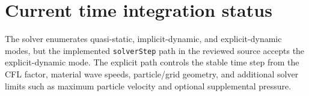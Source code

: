 \section{Current time integration status}
The solver enumerates quasi-static, implicit-dynamic, and explicit-dynamic modes, but the implemented \texttt{solverStep} path in the reviewed source accepts the explicit-dynamic mode.  The explicit path controls the stable time step from the CFL factor, material wave speeds, particle/grid geometry, and additional solver limits such as maximum particle velocity and optional supplemental pressure.

